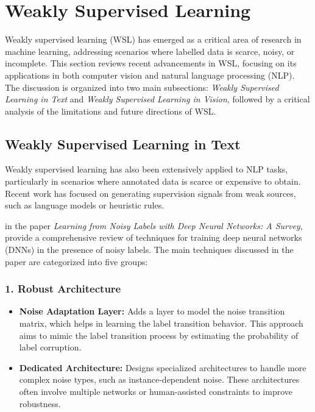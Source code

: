 \section{Weakly Supervised Learning}
\label{sec:weakly_supervised_back}
Weakly supervised learning (WSL) has emerged as a critical area of research in machine learning, addressing scenarios where labelled data is scarce, noisy, or incomplete. This section reviews recent advancements in WSL, focusing on its applications in both computer vision and natural language processing (NLP). The discussion is organized into two main subsections: \emph{Weakly Supervised Learning in Text} and \emph{Weakly Supervised Learning in Vision}, followed by a critical analysis of the limitations and future directions of WSL.

\subsection{Weakly Supervised Learning in Text}

Weakly supervised learning has also been extensively applied to NLP tasks, particularly in scenarios where annotated data is scarce or expensive to obtain. Recent work has focused on generating supervision signals from weak sources, such as language models or heuristic rules.
\newline

\citet{song_learning_2022} in the paper \emph{Learning from Noisy Labels with Deep Neural Networks: A Survey}, provide a comprehensive review of techniques for training deep neural networks (DNNs) in the presence of noisy labels. The main techniques discussed in the paper are categorized into five groups:

\subsubsection*{1. Robust Architecture}
\begin{itemize}
    \item \textbf{Noise Adaptation Layer:} Adds a layer to model the noise transition matrix, which helps in learning the label transition behavior. This approach aims to mimic the label transition process by estimating the probability of label corruption.
    \item \textbf{Dedicated Architecture:} Designs specialized architectures to handle more complex noise types, such as instance-dependent noise. These architectures often involve multiple networks or human-assisted constraints to improve robustness.
\end{itemize}

